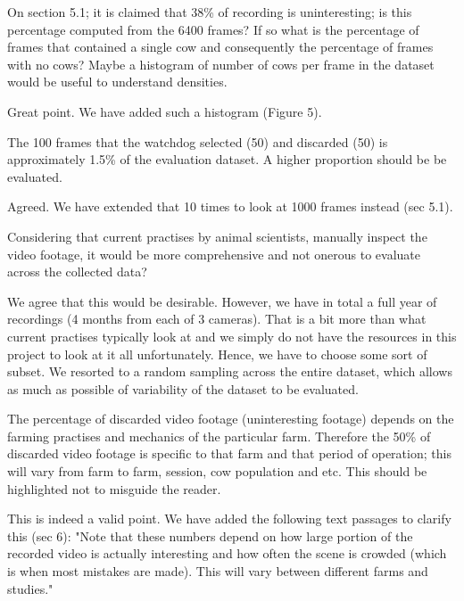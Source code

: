 \documentclass[10pt,a4paper]{letter}
\begin{document}
\begin{letter}{}
\begin{siderules}
On section 5.1; it is claimed that 38\% of recording is uninteresting; is this percentage computed from the 6400 frames? If so what is the percentage of 
frames that contained a single cow and consequently the percentage of frames with no cows? Maybe a histogram of number of cows per frame in the dataset 
would be useful to understand densities. 
\end{siderules}

Great point. We have added such a histogram (Figure 5).

\begin{siderules}
The 100 frames that the watchdog selected (50) and discarded (50) is approximately 1.5\% of the evaluation dataset. 
A higher proportion should be be evaluated. 
\end{siderules}

Agreed. We have extended that 10 times to look at 1000 frames instead (sec 5.1).

\begin{siderules}
Considering that current practises by animal scientists, manually inspect the video footage, it would be more 
comprehensive and not onerous to evaluate across the collected data?
\end{siderules}

We agree that this would be desirable. However, we have in total a full year of recordings (4 months from each of 3 cameras). 
That is a bit more than what current practises typically look at and
we simply do not have the resources in this project to look at it all unfortunately. 
Hence, we have to choose some sort of subset. We resorted to a random sampling across the
entire dataset, which allows as much as possible of variability of the dataset to be evaluated.

\begin{siderules}
The percentage of discarded video footage (uninteresting footage) depends on the farming practises and mechanics of the particular farm. Therefore the 50\% of discarded video footage is specific to that farm and that period of operation; this will vary from farm to farm, session, cow population and etc. This should be highlighted not to misguide the reader.
\end{siderules}

This is indeed a valid point. We have added the following text passages to clarify this (sec 6): "Note that these numbers depend on how large portion of the recorded video is actually interesting and how
often the scene is crowded (which is when most mistakes are made). This will vary between different farms and studies."


\end{letter}
\end{document}
